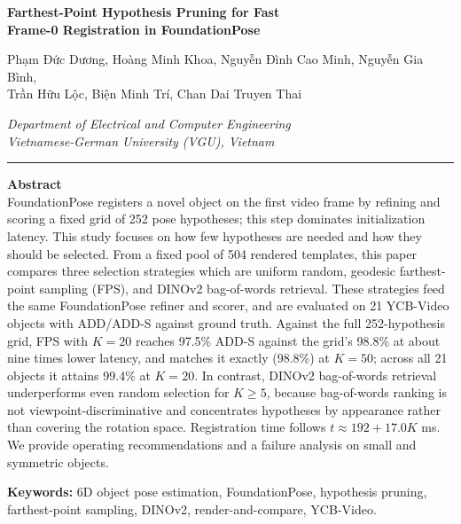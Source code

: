 \documentclass[11pt,letterpaper]{article}
\begin{document}
\begin{center}
{\large\bfseries Farthest-Point Hypothesis Pruning for Fast\\[2pt]
Frame-0 Registration in FoundationPose\par}
\vspace{10pt}
{\normalsize Phạm Đức Dương, Hoàng Minh Khoa, Nguyễn Đình Cao Minh, Nguyễn Gia Bình,\\
Trần Hữu Lộc, Biện Minh Trí, Chan Dai Truyen Thai\par}
\vspace{6pt}
{\small\itshape Department of Electrical and Computer Engineering\\
Vietnamese-German University (VGU), Vietnam\par}
\end{center}

\vspace{14pt}
\hrule
\vspace{12pt}

{\bfseries Abstract}\\[6pt]
FoundationPose registers a novel object on the first video frame by refining and scoring a fixed grid of 252 pose hypotheses; this step dominates initialization latency. This study focuses on how few hypotheses are needed and how they should be selected. From a fixed pool of 504 rendered templates, this paper compares three selection strategies which are uniform random, geodesic farthest-point sampling (FPS), and DINOv2 bag-of-words retrieval. These strategies feed the same FoundationPose refiner and scorer, and are evaluated on 21 YCB-Video objects with ADD/ADD-S against ground truth. Against the full 252-hypothesis grid, FPS with $K{=}20$ reaches 97.5\% ADD-S against the grid's 98.8\% at about nine times lower latency, and matches it exactly (98.8\%) at $K{=}50$; across all 21 objects it attains 99.4\% at $K{=}20$. In contrast, DINOv2 bag-of-words retrieval underperforms even random selection for $K \ge 5$, because bag-of-words ranking is not viewpoint-discriminative and concentrates hypotheses by appearance rather than covering the rotation space. Registration time follows $t \approx 192 + 17.0K$ ms. We provide operating recommendations and a failure analysis on small and symmetric objects.
\par\vspace{4pt}

\vspace{12pt}
{\bfseries Keywords:} 6D object pose estimation, FoundationPose, hypothesis pruning,
farthest-point sampling, DINOv2, render-and-compare, YCB-Video.
\end{document}
